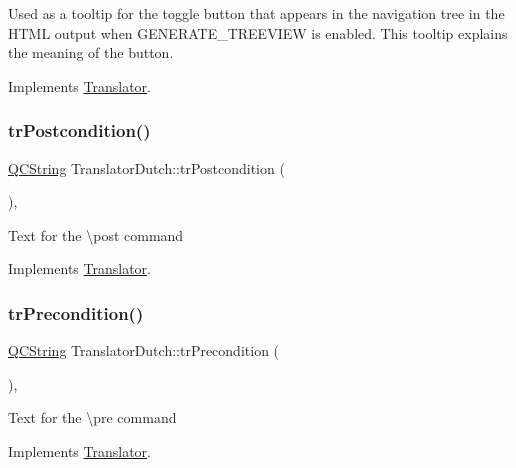 Used as a tooltip for the toggle button that appears in the navigation tree in the H\+T\+ML output when G\+E\+N\+E\+R\+A\+T\+E\+\_\+\+T\+R\+E\+E\+V\+I\+EW is enabled. This tooltip explains the meaning of the button. 

Implements \mbox{\hyperlink{class_translator}{Translator}}.

\mbox{\label{class_translator_dutch_aa8833fa29e2177386a097a715f8e1eea}} 
\subsubsection{\texorpdfstring{trPostcondition()}{trPostcondition()}}
{\footnotesize\ttfamily \mbox{\hyperlink{class_q_c_string}{Q\+C\+String}} Translator\+Dutch\+::tr\+Postcondition (\begin{DoxyParamCaption}{ }\end{DoxyParamCaption})\hspace{0.3cm}{\ttfamily [inline]}, {\ttfamily [virtual]}}

Text for the \textbackslash{}post command 

Implements \mbox{\hyperlink{class_translator}{Translator}}.

\mbox{\label{class_translator_dutch_a43002ae5834ed3ec426193706c6f81f2}} 
\subsubsection{\texorpdfstring{trPrecondition()}{trPrecondition()}}
{\footnotesize\ttfamily \mbox{\hyperlink{class_q_c_string}{Q\+C\+String}} Translator\+Dutch\+::tr\+Precondition (\begin{DoxyParamCaption}{ }\end{DoxyParamCaption})\hspace{0.3cm}{\ttfamily [inline]}, {\ttfamily [virtual]}}

Text for the \textbackslash{}pre command 

Implements \mbox{\hyperlink{class_translator}{Translator}}.

\mbox{\label{class_translator_dutch_a5634a2d94a9f2aef3b38e5e0ec91db0f}} 
